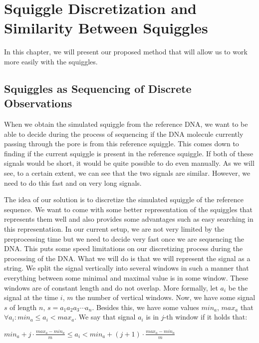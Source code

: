 \chapter{Squiggle Discretization and Similarity Between Squiggles}

\label{kap:proposedMethod} %

In this chapter, we will present our proposed method that will allow us to work
more easily with the squiggles.

\section{Squiggles as Sequencing of Discrete Observations}

When we obtain the simulated squiggle from the reference DNA, we want to be able
to decide during the process of sequencing if the DNA molecule currently passing
through the pore is from this reference squiggle. This comes down to finding if the
current squiggle is present in the reference squiggle. If both of these signals would
be short, it would be quite possible to do even manually. As we will see, to a
certain extent, we can see that the two signals are similar. However, we need to
do this fast and on very long signals.

The idea of our solution is to discretize the simulated squiggle of the
reference sequence. We want to come with some better representation of the
squiggles that represents them well and also provides some advantages such as
easy searching in this representation. In our current setup, we are
not very limited by the preprocessing time but we need to decide very fast once
we are sequencing the DNA. This puts some speed limitations on our discretizing
process during the processing of the DNA. What we will do is that we will
represent the signal as a string. We split the signal vertically into several
windows in such a manner that everything between some minimal and maximal
value is in some window. These windows are of constant length and do not
overlap. More formally, let $a_i$ be the signal at the time $i$, $m$ the number of
vertical windows. Now, we have some signal $s$ of length $n$, $s=a_1a_2a_3\cdots a_n$.
Besides this, we have some values $min_a$, $max_a$ that $\forall a_i: min_a \leq a_i < max_a$.
We say that signal $a_i$ is in $j$-th window if it holds that:

\begin{center}
$min_a + j\cdot \frac{max_a-min_a}{m} \leq a_i < min_a + (j+1)\cdot \frac{max_a-min_a}{m}$
\end{center}

